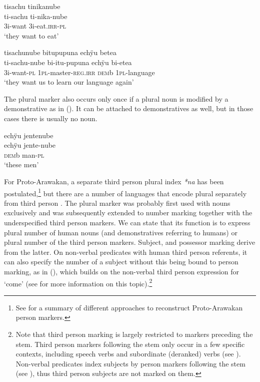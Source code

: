 \ea\label{ex:FirstPlural-4}
\begingl
\glpreamble tisachu tinikanube\\
\gla ti-sachu ti-nika-nube\\
\glb 3i-want 3i-eat.\textsc{irr}-\textsc{pl}\\
\glft ‘they want to eat’
\endgl
\trailingcitation{[jxx-e190210s-01]}
\xe

\ea\label{ex:2023-FirstPlural}
\begingl
\glpreamble tisachunube bitupupuna echÿu betea\\
\gla ti-sachu-nube bi-itu-pupuna echÿu bi-etea\\
\glb 3i-want-\textsc{pl} 1\textsc{pl}-master-\textsc{reg.irr} \textsc{dem}b 1\textsc{pl}-language\\
\glft ‘they want us to learn our language again’
\endgl
\trailingcitation{[ump-p110815sf.130-133]}
\xe


The plural marker also occurs only once if a plural noun is modified by a demonstrative as in (). It can be attached to demonstratives as well, but in those cases there is usually no noun.

\ea\label{ex:FirstPlural-5}
\begingl
\glpreamble echÿu jentenube\\
\gla echÿu jente-nube\\
\glb \textsc{dem}b man-\textsc{pl}\\
\glft ‘these men’
\endgl
\trailingcitation{[mxx-p110825l.045]}
\xe

For Proto-Arawakan, a separate third person plural index \textit{*na} has been postulated,\footnote{See \citet[505, 513]{Danielsen2011} for a summary of different approaches to reconstruct Proto-Arawakan person markers.} but there are a number of languages that encode plural separately from third person \citep[]{Danielsen2014}. The plural marker was probably first used with nouns exclusively and was subsequently extended to number marking together with the underspecified third person markers. We can state that its function is to express plural number of human nouns (and demonstratives referring to humans) or plural number of the third person markers. Subject,  and possessor marking derive from the latter. On non-verbal predicates with human third person referents, it can also specify the number of a subject without this being bound to person marking, as in (), which builds on the non-verbal third person expression for ‘come’ (see  for more information on this topic).\footnote{Note that third person marking is largely restricted to markers preceding the stem. Third person markers following the stem only occur in a few specific contexts, including speech verbs and subordinate (deranked) verbs (see ). Non-verbal predicates index subjects by person markers following the stem (see ), thus third person subjects are not marked on them.}

